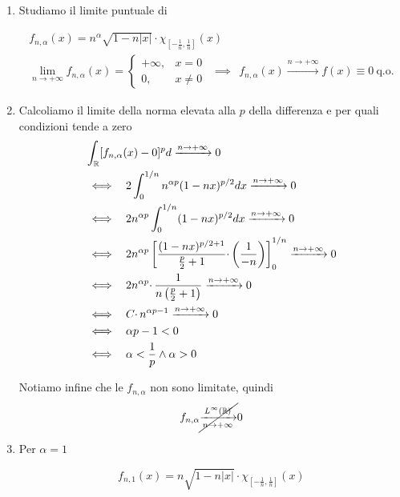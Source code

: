 \Soluzione
\begin{enumerate}
\item Studiamo il limite puntuale di

\begin{gather*}
f_{n,\alpha }( x) =n^{\alpha }\sqrt{1-n| x| } \cdotp \chi _{\left[ -\frac{1}{n} ,\frac{1}{n}\right]}( x)\\
\lim\limits _{n\rightarrow +\infty } f_{n,\alpha }( x) =\begin{cases}
+\infty , & x=0\\
0, & x\neq 0
\end{cases} \ \ \implies \ \ f_{n,\alpha }( x)\xrightarrow{n\rightarrow +\infty } f( x) \equiv 0\ \text{q.o.}
\end{gather*}
\item Calcoliamo il limite della norma elevata alla $p$ della differenza e per quali condizioni tende a zero\begin{align*}
 & \int _{\mathbb{R} }[ f_{n,\alpha }( x) -0]^{p} d\xrightarrow{n\rightarrow +\infty } 0\\
 & \iff \ \ 2\int ^{1/n}_{0} n^{\alpha p}( 1-nx)^{p/2} dx\xrightarrow{n\rightarrow +\infty } 0\\
 & \iff \ \ 2n^{\alpha p}\int ^{1/n}_{0}( 1-nx)^{p/2} dx\xrightarrow{n\rightarrow +\infty } 0\\
 & \iff \ \ 2n^{\alpha p}\left[\frac{( 1-nx)^{p/2+1}}{\frac{p}{2} +1} \cdotp \left(\frac{1}{-n}\right)\right]^{1/n}_{0}\xrightarrow{n\rightarrow +\infty } 0\\
 & \iff \ \ 2n^{\alpha p} \cdotp \frac{1}{n\left(\frac{p}{2} +1\right)}\xrightarrow{n\rightarrow +\infty } 0\\
 & \iff \ \ C\cdotp n^{\alpha p-1}\xrightarrow{n\rightarrow +\infty } 0\\
 & \iff \ \ \alpha p-1< 0\\
 & \iff \ \ \alpha < \frac{1}{p} \land \alpha  >0
\end{align*}

Notiamo infine che le $f_{n,\alpha }$ non sono limitate, quindi\begin{equation*}
f_{n,\alpha }\cancel{\xrightarrow[n\rightarrow +\infty ]{L^{\infty }(\mathbb{R} )}} 0
\end{equation*}
\item Per $\alpha =1$

\begin{equation*}
f_{n,1}( x) =n\sqrt{1-n| x| } \cdotp \chi _{\left[ -\frac{1}{n} ,\frac{1}{n}\right]}( x)
\end{equation*}


\end{enumerate}
